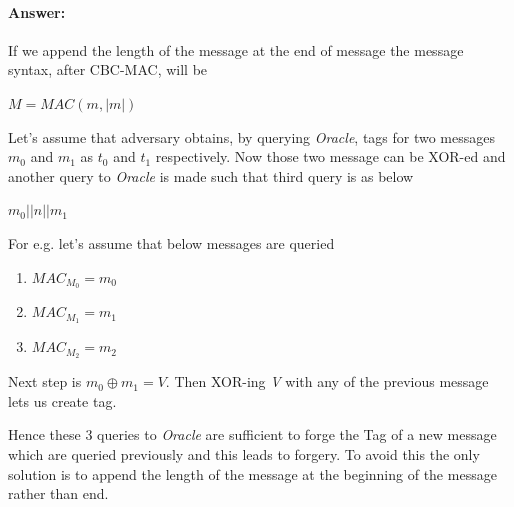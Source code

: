 \documentclass{article}
\begin{document}
    \paragraph{Answer: \newline}
        If we append the length of the message at the end of message the message syntax, after CBC-MAC, will be \newline
        \begin{center}
            $\mathit{M} = MAC(m,|m|)$
        \end{center}
        Let's assume that adversary obtains, by querying \emph{Oracle}, tags for two messages $\mathit{m_0}$ and $\mathit{m_1}$ as $\mathit{t_0}$ and $\mathit{t_1}$ respectively. Now those two message can be XOR-ed and another query to \emph{Oracle} is made such that third query is as below \newline
        \begin{center}
            $\mathit{m_0||n||m_1}$
        \end{center}
        For e.g. let's assume that below messages are queried \newline
        \begin{enumerate}
            \item $MAC_{M_0} = \mathit{m_0}$
            \item $MAC_{M_1} = \mathit{m_1}$
            \item $MAC_{M_2} = \mathit{m_2}$
        \end{enumerate}
        
        Next step is ${m_0} \oplus{m_1} = \mathit{V}$. Then XOR-ing \emph{V} with any of the previous message lets us create tag.
        
        Hence these 3 queries to \emph{Oracle} are sufficient to forge the Tag of a new message which are queried previously and this leads to forgery. \newline
        To avoid this the only solution is to append the length of the message at the beginning of the message rather than end.




\end{document}
